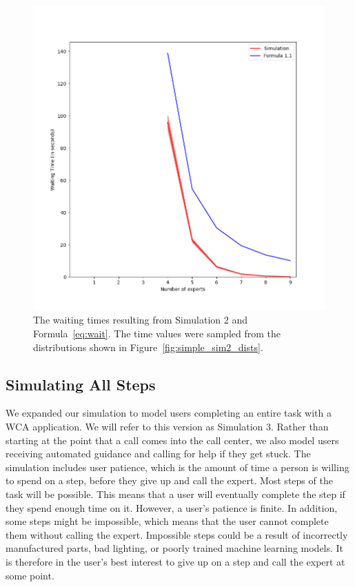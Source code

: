 \begin{figure}[H]
  \includegraphics[width=\textwidth]{figures/montecarlo/independent_calls_expon.png}
  \caption{
    The waiting times resulting from Simulation 2 and Formula~\ref{eq:wait}.
    The time values were sampled from the distributions shown in
    Figure~\ref{fig:simple_sim2_dists}.
  }\label{fig:simple_sim2_results}
\end{figure}

\subsection{Simulating All Steps}

We expanded our simulation to model users completing an entire task with a WCA
application.
We will refer to this version as Simulation 3.
Rather than starting at the point that a call comes into the call center, we
also model users receiving automated guidance and calling for help if they get
stuck.
The simulation includes user patience, which is the amount of time a person is
willing to spend on a step, before they give up and call the expert.
Most steps of the task will be possible.
This means that a user will eventually complete the step if they spend enough
time on it.
However, a user's patience is finite.
In addition, some steps might be impossible, which means that the user cannot
complete them without calling the expert.
Impossible steps could be a result of incorrectly manufactured parts, bad
lighting, or poorly trained machine learning models.
It is therefore in the user's best interest to give up on a step and call the
expert at some point.

